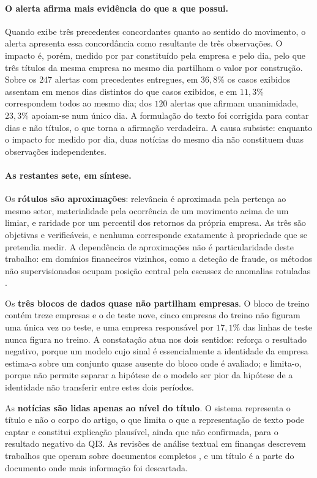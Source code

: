 \paragraph{O alerta afirma mais evidência do que a que possui.}
Quando exibe três precedentes concordantes quanto ao sentido do movimento, o alerta apresenta essa
concordância como resultante de três observações. O impacto é, porém, medido por par constituído
pela empresa e pelo dia, pelo que três títulos da mesma empresa no mesmo dia partilham o valor por
construção. Sobre os $247$ alertas com precedentes entregues, em $36{,}8\%$ os casos exibidos
assentam em menos dias distintos do que casos exibidos, e em $11{,}3\%$ correspondem todos ao mesmo
dia; dos $120$ alertas que afirmam unanimidade, $23{,}3\%$ apoiam-se num único dia. A formulação do
texto foi corrigida para contar dias e não títulos, o que torna a afirmação verdadeira. A causa
subsiste: enquanto o impacto for medido por dia, duas notícias do mesmo dia não constituem duas
observações independentes.

\paragraph{As restantes sete, em síntese.}
Os \textbf{rótulos são aproximações}: relevância é aproximada pela pertença ao mesmo setor,
materialidade pela ocorrência de um movimento acima de um limiar, e raridade por um percentil dos
retornos da própria empresa. As três são objetivas e verificáveis, e nenhuma corresponde exatamente
à propriedade que se pretendia medir. A dependência de aproximações não é particularidade deste
trabalho: em domínios financeiros vizinhos, como a deteção de fraude, os métodos não supervisionados
ocupam posição central pela escassez de anomalias rotuladas \autocite{ahmed2016financial}.

Os \textbf{três blocos de dados quase não partilham empresas}. O bloco de treino contém treze
empresas e o de teste nove, cinco empresas do treino não figuram uma única vez no teste, e uma
empresa responsável por $17{,}1\%$ das linhas de teste nunca figura no treino. A constatação atua
nos dois sentidos: reforça o resultado negativo, porque um modelo cujo sinal é essencialmente a
identidade da empresa estima-a sobre um conjunto quase ausente do bloco onde é avaliado; e
limita-o, porque não permite separar a hipótese de o modelo ser pior da hipótese de a identidade não
transferir entre estes dois períodos.

As \textbf{notícias são lidas apenas ao nível do título}. O sistema representa o título e não o
corpo do artigo, o que limita o que a representação de texto pode captar e constitui explicação
plausível, ainda que não confirmada, para o resultado negativo da \gls{QI}3. As revisões de análise
textual em finanças descrevem trabalhos que operam sobre documentos completos
\autocite{kearney2014textual}, e um título é a parte do documento onde mais informação foi
descartada.

